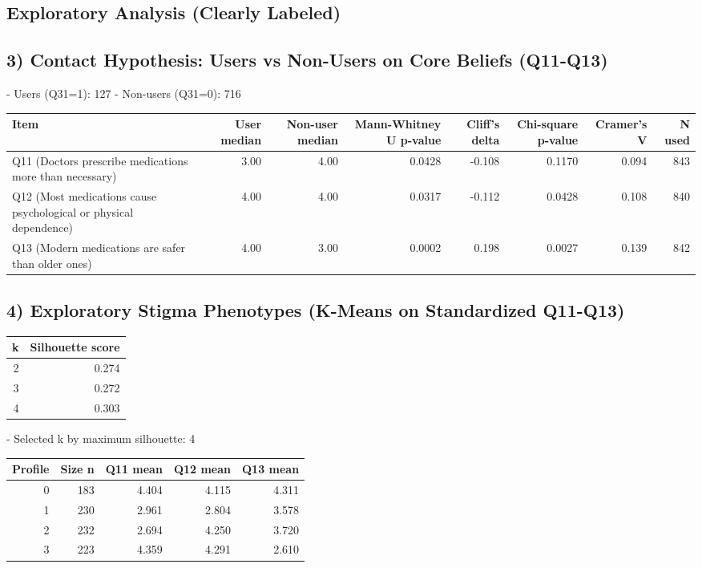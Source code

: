 \documentclass[12pt,a4paper]{article}
\begin{document}
\subsection*{Exploratory Analysis (Clearly Labeled)}
\subsection*{3) Contact Hypothesis: Users vs Non-Users on Core Beliefs (Q11-Q13)}
- Users (Q31=1): 127 - Non-users (Q31=0): 716

\begin{center}
\small
\begin{tabular}{lrrrrrrr}
\hline
\textbf{Item} & \textbf{User median} & \textbf{Non-user median} & \textbf{Mann-Whitney U p-value} & \textbf{Cliff's delta} & \textbf{Chi-square p-value} & \textbf{Cramer's V} & \textbf{N used} \\
\hline
Q11 (Doctors prescribe medications more than necessary) & 3.00 & 4.00 & 0.0428 & -0.108 & 0.1170 & 0.094 & 843 \\
Q12 (Most medications cause psychological or physical dependence) & 4.00 & 4.00 & 0.0317 & -0.112 & 0.0428 & 0.108 & 840 \\
Q13 (Modern medications are safer than older ones) & 4.00 & 3.00 & 0.0002 & 0.198 & 0.0027 & 0.139 & 842 \\
\hline
\end{tabular}
\end{center}
\subsection*{4) Exploratory Stigma Phenotypes (K-Means on Standardized Q11-Q13)}
\begin{center}
\small
\begin{tabular}{rr}
\hline
\textbf{k} & \textbf{Silhouette score} \\
\hline
2 & 0.274 \\
3 & 0.272 \\
4 & 0.303 \\
\hline
\end{tabular}
\end{center}
- Selected k by maximum silhouette: 4

\begin{center}
\small
\begin{tabular}{rrrrr}
\hline
\textbf{Profile} & \textbf{Size n} & \textbf{Q11 mean} & \textbf{Q12 mean} & \textbf{Q13 mean} \\
\hline
0 & 183 & 4.404 & 4.115 & 4.311 \\
1 & 230 & 2.961 & 2.804 & 3.578 \\
2 & 232 & 2.694 & 4.250 & 3.720 \\
3 & 223 & 4.359 & 4.291 & 2.610 \\
\hline
\end{tabular}
\end{center}
\end{document}
